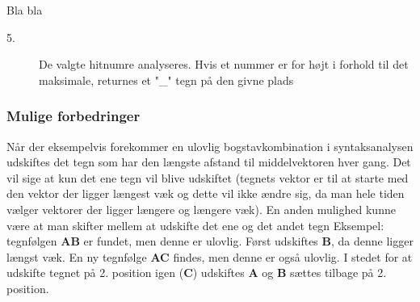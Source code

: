 Bla bla

\begin{description}
\item[5.] De valgte hitnumre analyseres. Hvis et nummer er for højt i forhold til det maksimale, returnes et "\_" tegn på den givne plads
\end{description}

\subsubsection{Mulige forbedringer}
Når der eksempelvis forekommer en ulovlig bogstavkombination i syntaksanalysen udskiftes det tegn som har den længste afstand til middelvektoren hver gang. Det vil sige at kun det ene tegn vil blive udskiftet (tegnets vektor er til at starte med den vektor der ligger længest væk og dette vil ikke ændre sig, da man hele tiden vælger vektorer der ligger længere og længere væk). En anden mulighed kunne være at man skifter mellem at udskifte det ene og det andet tegn Eksempel: tegnfølgen \textbf{AB} er fundet, men denne er ulovlig. Først udskiftes \textbf{B}, da denne ligger længst væk. En ny tegnfølge \textbf{AC} findes, men denne er også ulovlig. I stedet for at udskifte tegnet på 2. position igen (\textbf{C}) udskiftes \textbf{A} og \textbf{B} sættes tilbage på 2. position.
